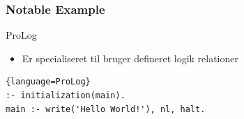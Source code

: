\documentclass[12pt,t]{beamer}
\begin{document}
\begin{frame}[fragile]
\frametitle{Notable Example}
\begin{block}{ProLog}
\begin{itemize}
\item Er specialiseret til bruger defineret logik relationer
\end{itemize}
\end{block}
\begin{lstlisting}{language=ProLog}
:- initialization(main).
main :- write('Hello World!'), nl, halt.
\end{lstlisting}
\end{frame}
\end{document}
